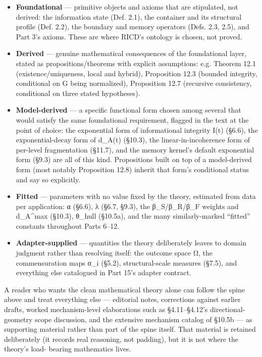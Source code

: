 \documentclass[
]{article}
\begin{document}
\begin{itemize}
\item
  \textbf{Foundational} --- primitive objects and axioms that are
  stipulated, not derived: the information state (Def. 2.1), the
  container and its structural profile (Def. 2.2), the boundary and
  memory operators (Defs. 2.3, 2.5), and Part 3's axioms. These are
  where RICD's ontology is chosen, not proved.
\item
  \textbf{Derived} --- genuine mathematical consequences of the
  foundational layer, stated as propositions/theorems with explicit
  assumptions: e.g. Theorem 12.1 (existence/uniqueness, local and
  hybrid), Proposition 12.3 (bounded integrity, conditional on G being
  normalized), Proposition 12.7 (recursive consistency, conditional on
  three stated hypotheses).
\item
  \textbf{Model-derived} --- a specific functional form chosen among
  several that would satisfy the same foundational requirement, flagged
  in the text at the point of choice: the exponential form of
  informational integrity I(t) (§6.6), the exponential-decay form of
  d\_A(t) (§10.3), the linear-in-incoherence form of per-level
  fragmentation (§11.7), and the memory kernel's default exponential
  form (§9.3) are all of this kind. Propositions built on top of a
  model-derived form (most notably Proposition 12.8) inherit that form's
  conditional status and say so explicitly.
\item
  \textbf{Fitted} --- parameters with no value fixed by the theory,
  estimated from data per application: α (§6.6), λ (§6.7, §9.3), the
  β\_S/β\_R/β\_F weights and d\_A\^{}max (§10.3), θ\_hull (§10.5a), and
  the many similarly-marked ``fitted'' constants throughout Parts 6--12.
\item
  \textbf{Adapter-supplied} --- quantities the theory deliberately
  leaves to domain judgment rather than resolving itself: the outcome
  space Ω, the commensuration maps σ\_i (§5.2), structural-scale
  measures (§7.5), and everything else catalogued in Part 15's adapter
  contract.
\end{itemize}

A reader who wants the clean mathematical theory alone can follow the
spine above and treat everything else --- editorial notes, corrections
against earlier drafts, worked mechanism-level elaborations such as
§4.11--§4.12's directional-geometry scope discussion, and the extensive
mechanism catalog of §10.5b --- as supporting material rather than part
of the spine itself. That material is retained deliberately (it records
real reasoning, not padding), but it is not where the theory's load-
bearing mathematics lives.
\end{document}
